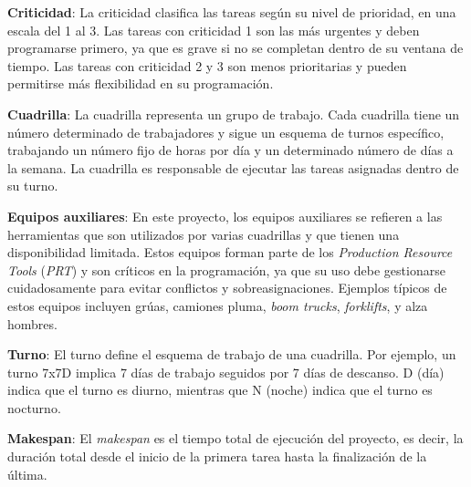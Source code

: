 \documentclass{article}
\begin{document}
\textbf{Criticidad}: La criticidad clasifica las tareas según su nivel de prioridad, en una escala del 1 al 3. Las tareas con criticidad 1 son las más urgentes y deben programarse primero, ya que es grave si no se completan dentro de su ventana de tiempo. Las tareas con criticidad 2 y 3 son menos prioritarias y pueden permitirse más flexibilidad en su programación.


\textbf{Cuadrilla}: La cuadrilla representa un grupo de trabajo. Cada cuadrilla tiene un número determinado de trabajadores y sigue un esquema de turnos específico, trabajando un número fijo de horas por día y un determinado número de días a la semana. La cuadrilla es responsable de ejecutar las tareas asignadas dentro de su turno.

\textbf{Equipos auxiliares}: En este proyecto, los equipos auxiliares se refieren a las herramientas que son utilizados por varias cuadrillas y que tienen una disponibilidad limitada. Estos equipos forman parte de los \textit{Production Resource Tools} (\textit{PRT}) y son críticos en la programación, ya que su uso debe gestionarse cuidadosamente para evitar conflictos y sobreasignaciones. Ejemplos típicos de estos equipos incluyen grúas, camiones pluma, \textit{boom trucks}, \textit{forklifts}, y alza hombres.

\textbf{Turno}: El turno define el esquema de trabajo de una cuadrilla. Por ejemplo, un turno 7x7D implica 7 días de trabajo seguidos por 7 días de descanso. D (día) indica que el turno es diurno, mientras que N (noche) indica que el turno es nocturno.

\textbf{Makespan}: El \textit{makespan} es el tiempo total de ejecución del proyecto, es decir, la duración total desde el inicio de la primera tarea hasta la finalización de la última.


\end{document}
